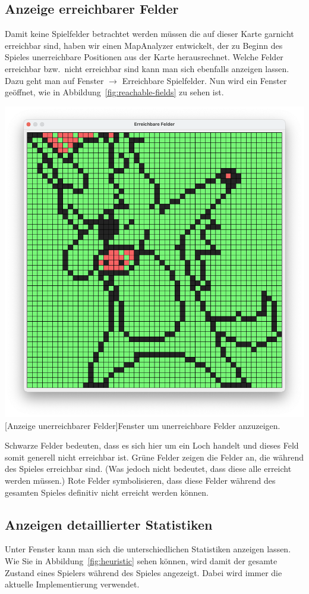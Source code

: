 \subsection{Anzeige erreichbarer Felder}\label{subsec:anzeige-erreichbarer-felder}
Damit keine Spielfelder betrachtet werden m\"ussen die auf dieser Karte garnicht erreichbar sind, haben wir einen MapAnalyzer entwickelt, der zu Beginn des Spieles unerreichbare Positionen aus der Karte herausrechnet.
Welche Felder erreichbar bzw.\ nicht erreichbar sind kann man sich ebenfalls anzeigen lassen.
Dazu geht man auf Fenster $\rightarrow$ Erreichbare Spielfelder.
Nun wird ein Fenster ge\"offnet, wie in Abbildung~\ref{fig:reachable-fields} zu sehen ist.

\vspace{1em}
\begin{minipage}{\linewidth}
    \centering
    \includegraphics[width=0.6\linewidth]{pics/reachable-fields}
    [Anzeige unerreichbarer Felder]{Fenster um unerreichbare Felder anzuzeigen.}
    \label{fig:reachable-fields}
\end{minipage}

Schwarze Felder bedeuten, dass es sich hier um ein Loch handelt und dieses Feld somit generell nicht erreichbar ist.
Gr\"une Felder zeigen die Felder an, die w\"ahrend des Spieles erreichbar sind.
(Was jedoch nicht bedeutet, dass diese alle erreicht werden m\"ussen.)
Rote Felder symbolisieren, dass diese Felder w\"ahrend des gesamten Spieles definitiv nicht erreicht werden k\"onnen.

\subsection{Anzeigen detaillierter Statistiken}\label{subsec:anzeigen-detaillierter-statistiken}
Unter Fenster kann man sich die unterschiedlichen Statistiken anzeigen lassen.
Wie Sie in Abbildung~\ref{fig:heuristic} sehen k\"onnen, wird damit der gesamte Zustand eines Spielers w\"ahrend des Spieles angezeigt.
Dabei wird immer die aktuelle Implementierung verwendet.

